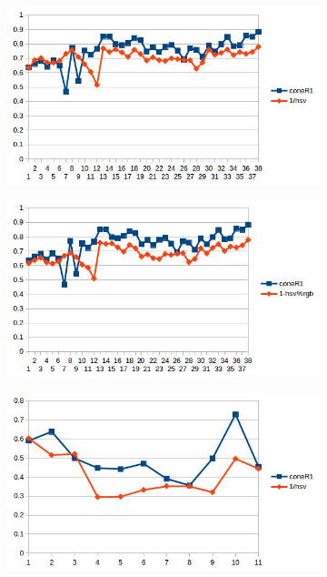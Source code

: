 \documentclass[12pt]{report}
\begin{document}
\begin{figure}
\hfill
\begin{subfigure}{.49\linewidth}
  \includegraphics[width=1\linewidth]{figures/correlations/db/campus_hsv.jpg}
  \caption{}
\end{subfigure}
\begin{subfigure}{.49\linewidth}
  \includegraphics[width=1\linewidth]{figures/correlations/rgb/campus_hsv.jpg}
  \caption{}
\end{subfigure}
\hfill
\begin{subfigure}{.49\linewidth}
  \includegraphics[width=1\linewidth]{figures/correlations/db/pets2_hsv.jpg}

\end{subfigure}
\end{figure}
\end{document}
